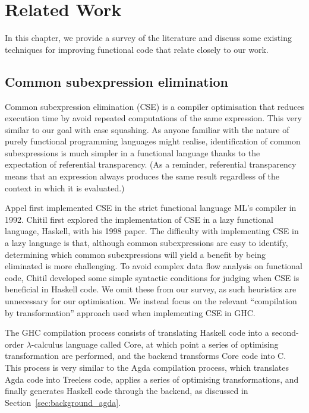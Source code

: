 \chapter{Related Work}
\label{cha:related_work}

In this chapter, we provide a survey of the literature and discuss some existing techniques for improving functional code that relate closely to our work.

\section{Common subexpression elimination}

Common subexpression elimination (CSE) is a compiler optimisation that reduces execution time by avoid repeated computations of the same expression.\citep{Chitil-1998} This very similar to our goal with case squashing. As anyone familiar with the nature of purely functional programming languages might realise, identification of common subexpressions is much simpler in a functional language thanks to the expectation of referential transparency.\citep{Chitil-1998} (As a reminder, referential transparency means that an expression always produces the same result regardless of the context in which it is evaluated.)

Appel first implemented CSE in the strict functional language ML's compiler in 1992.\citep{appel1992} Chitil first explored the implementation of CSE in a lazy functional language, Haskell, with his 1998 paper.\citep{Chitil-1998} The difficulty with implementing CSE in a lazy language is that, although common subexpressions are easy to identify, determining which common subexpressions will yield a benefit by being eliminated is more challenging. To avoid complex data flow analysis on functional code, Chitil developed some simple syntactic conditions for judging when CSE is beneficial in Haskell code.\citep{Chitil-1998} We omit these from our survey, as such heuristics are unnecessary for our optimisation. We instead focus on the relevant ``compilation by transformation'' approach used when implementing CSE in GHC.

The GHC compilation process consists of translating Haskell code into a second-order $\lambda$-calculus language called Core, at which point a series of optimising transformation are performed, and the backend transforms Core code into C.\citep{Chitil-1998} This process is very similar to the Agda compilation process, which translates Agda code into Treeless code, applies a series of optimising transformations, and finally generates Haskell code through the backend, as discussed in Section~\ref{sec:background_agda}.

